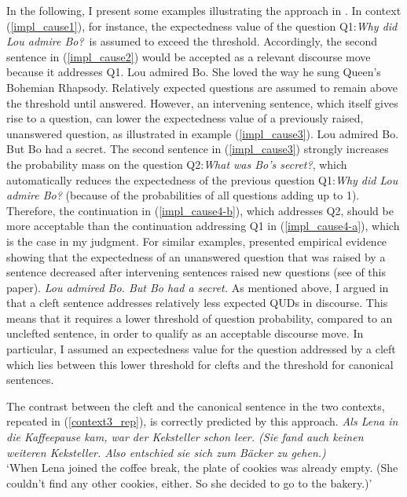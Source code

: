 \documentclass[output=paper,colorlinks,citecolor=brown]{langscibook}
\begin{document}
In the following, I present some examples illustrating the approach in \citet{tonnis_2021}. In context (\ref{impl_cause1}), for instance, the expectedness value of the question Q1:\textit{Why did Lou admire Bo?}~is assumed to exceed the threshold. Accordingly, the second sentence in (\ref{impl_cause2}) would be accepted as a relevant discourse move because it addresses Q1.
\ea\label{impl_cause2}Lou admired Bo. She loved the way he sung Queen's Bohemian Rhapsody.
\z
Relatively expected questions are assumed to remain above the threshold until answered. However, an intervening sentence, which itself gives rise to a question, can lower the expectedness value of a previously raised, unanswered question, as illustrated in example (\ref{impl_cause3}).
\ea\label{impl_cause3}Lou admired Bo. But Bo had a secret.
\z
The second sentence in (\ref{impl_cause3}) strongly increases the probability mass on the question Q2:\textit{What was Bo's secret?}, which automatically reduces the expectedness of the previous question Q1:\textit{Why did Lou admire Bo?} (because of the probabilities of all questions adding up to 1). Therefore, the continuation in (\ref{impl_cause4-b}), which addresses Q2, should be more acceptable than the continuation addressing Q1 in (\ref{impl_cause4-a}), which is the case in my judgment. For similar examples, \citet{tonnis_tonhauser_2022} presented empirical evidence showing that the expectedness of an unanswered question that was raised by a sentence decreased after intervening sentences raised new questions (see  of this paper).
\ea\label{impl_cause4}\textit{Lou admired Bo. But Bo had a secret.}
\z
\z
%
As mentioned above, I argued in \citet{tonnis_2021} that a cleft sentence addresses relatively less expected QUDs in discourse. This means that it requires a lower threshold of question probability, compared to an unclefted sentence, in order to qualify as an acceptable discourse move. In particular, I assumed an expectedness value for the question addressed by a cleft which lies between this lower threshold for clefts and the threshold for canonical sentences.

The contrast between the cleft and the canonical sentence in the two contexts, repeated in (\ref{context3_rep}), is correctly predicted by this approach. 
\ea\label{context3_rep}\textit{Als Lena in die Kaffeepause kam, war der Keksteller schon leer. (Sie fand auch keinen weiteren Keksteller. Also entschied sie sich zum Bäcker zu gehen.)}\\
`When Lena joined the coffee break, the plate of cookies was already empty. (She couldn't find any other cookies, either. So she decided to go to the bakery.)'
\z
\z \largerpage
\end{document}
